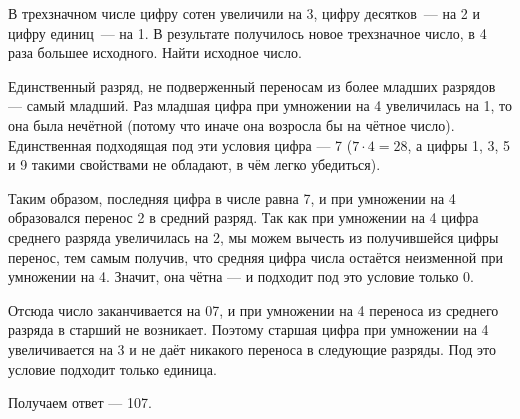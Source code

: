 \begin{itemize}

	\itB В трехзначном числе цифру сотен увеличили на 3, цифру десятков~— на 2 и цифру единиц~— на 1. В результате получилось новое трехзначное число, в 4 раза большее исходного. Найти исходное число.
	
	\itr Единственный разряд, не подверженный переносам из более младших разрядов — самый младший. Раз младшая цифра при умножении на 4 увеличилась на 1, то она была нечётной (потому что иначе она возросла бы на чётное число). Единственная подходящая под эти условия цифра — 7 ($7 \cdot 4 = 28$, а цифры 1, 3, 5 и 9 такими свойствами не обладают, в чём легко убедиться).
	
	Таким образом, последняя цифра в числе равна 7, и при умножении на 4 образовался перенос 2 в средний разряд. Так как при умножении на 4 цифра среднего разряда увеличилась на 2, мы можем вычесть из получившейся цифры перенос, тем самым получив, что средняя цифра числа остаётся неизменной при умножении на 4. Значит, она чётна — и подходит под это условие только 0.
	
	Отсюда число заканчивается на 07, и при умножении на 4 переноса из среднего разряда в старший не возникает. Поэтому старшая цифра при умножении на 4 увеличивается на 3 и не даёт никакого переноса в следующие разряды. Под это условие подходит только единица.
	
	Получаем ответ — 107.

\end{itemize}
